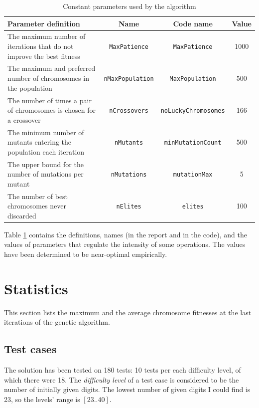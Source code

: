 \documentclass[10pt]{article}
\begin{document}
\begin{table}[!h]
    \begin{center}
        \begin{tabularx}{0.9\textwidth}{|>{\centering\arraybackslash}X|c|c|c|}
        \hline
        \textbf{Parameter definition} & \textbf{Name} & \textbf{Code name} & \textbf{Value} \\\hline
        The maximum number of iterations that do not improve the best fitness & \texttt{MaxPatience} & \texttt{MaxPatience} & 1000 \\\hline
        The maximum and preferred number of chromosomes in the population & \texttt{nMaxPopulation} & \texttt{MaxPopulation} & 500 \\\hline
        The number of times a pair of chromosomes is chosen for a crossover & \texttt{nCrossovers} & \texttt{noLuckyChromosomes} & 166 \\\hline
        The minimum number of mutants entering the population each iteration & \texttt{nMutants} & \texttt{minMutationCount} & 500 \\\hline
        The upper bound for the number of mutations per mutant & \texttt{nMutations} & \texttt{mutationMax} & 5 \\\hline
        The number of best chromosomes never discarded & \texttt{nElites} & \texttt{elites} & 100 \\\hline
    \end{tabularx}
    \end{center}
    \caption{Constant parameters used by the algorithm}\label{paramtable}
\end{table}

Table \ref{paramtable} contains the definitions, names (in the report and in the code),
and the values of parameters that regulate the intensity of some operations. The
values have been determined to be near-optimal empirically.

\section{Statistics}
This section lists the maximum and the average chromosome fitnesses at the
last iterations of the genetic algorithm.

\subsection{Test cases}
The solution has been tested on 180 tests: 10 tests per each difficulty level, of
which there were 18. The \textit{difficulty level} of a test case is considered
to be the number of initially given digits. The lowest number of given digits
I could find is 23, so the levels' range is $[23..40]$.
\end{document}
